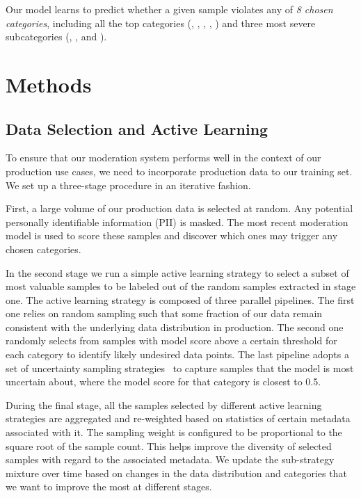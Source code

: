 \documentclass[letterpaper]{article} %
\begin{document}
Our model learns to predict whether a given sample violates any of \textit{8 chosen categories}, including all the top categories (, , , , ) and three most severe subcategories (, , and ).


\section{Methods}

\subsection{Data Selection and Active Learning}
\label{sec:activelearning}

To ensure that our moderation system performs well in the context of our production use cases, we need to incorporate production data to our training set. We set up a three-stage procedure in an iterative fashion.

First, a large volume of our production data is selected at random. Any potential personally identifiable information (PII) is masked. The most recent moderation model is used to score these samples and discover which ones may trigger any chosen categories. 

In the second stage we run a simple active learning strategy to select a subset of most valuable samples to be labeled out of the random samples extracted in stage one. The active learning strategy is composed of three parallel pipelines. The first one relies on random sampling such that some fraction of our data remain consistent with the underlying data distribution in production. The second one randomly selects from samples with model score above a certain threshold for each category to identify likely undesired data points. The last pipeline adopts a set of uncertainty sampling strategies~\cite{lewis1994sequential,lewis1994heterogeneous} to capture samples that the model is most uncertain about, where the model score for that category is closest to 0.5. %

During the final stage, all the samples selected by different active learning strategies are aggregated and re-weighted based on statistics of certain metadata associated with it. The sampling weight is configured to be proportional to the square root of the sample count. This helps improve the diversity of selected samples with regard to the associated metadata. We update the sub-strategy mixture over time based on changes in the data distribution and categories that we want to improve the most at different stages.
\end{document}
